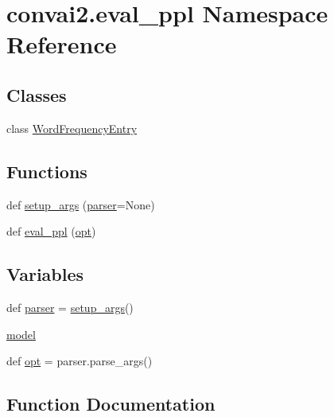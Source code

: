 \hypertarget{namespaceconvai2_1_1eval__ppl}{}\section{convai2.\+eval\+\_\+ppl Namespace Reference}
\label{namespaceconvai2_1_1eval__ppl}
\subsection*{Classes}
\begin{DoxyCompactItemize}
\item 
class \hyperlink{classconvai2_1_1eval__ppl_1_1WordFrequencyEntry}{Word\+Frequency\+Entry}
\end{DoxyCompactItemize}
\subsection*{Functions}
\begin{DoxyCompactItemize}
\item 
def \hyperlink{namespaceconvai2_1_1eval__ppl_a7c5c67a76df91f064ac903d243682416}{setup\+\_\+args} (\hyperlink{namespaceconvai2_1_1eval__ppl_ac28d261be7be5cfc9e48ee440c7c94bd}{parser}=None)
\item 
def \hyperlink{namespaceconvai2_1_1eval__ppl_a7c502afabfc1181087e66b4e9662f15f}{eval\+\_\+ppl} (\hyperlink{namespaceconvai2_1_1eval__ppl_a34d7661f145bf1fe9770aec4c4e64cc1}{opt})
\end{DoxyCompactItemize}
\subsection*{Variables}
\begin{DoxyCompactItemize}
\item 
def \hyperlink{namespaceconvai2_1_1eval__ppl_ac28d261be7be5cfc9e48ee440c7c94bd}{parser} = \hyperlink{namespaceconvai2_1_1eval__ppl_a7c5c67a76df91f064ac903d243682416}{setup\+\_\+args}()
\item 
\hyperlink{namespaceconvai2_1_1eval__ppl_ab0bd8644f41db5ba43b043cf2e1a0d4d}{model}
\item 
def \hyperlink{namespaceconvai2_1_1eval__ppl_a34d7661f145bf1fe9770aec4c4e64cc1}{opt} = parser.\+parse\+\_\+args()
\end{DoxyCompactItemize}


\subsection{Function Documentation}
\mbox{\label{namespaceconvai2_1_1eval__ppl_a7c502afabfc1181087e66b4e9662f15f}} 
